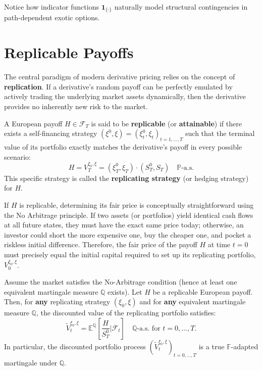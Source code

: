 Notice how indicator functions $\mathbf{1}_{\{\cdot\}}$ naturally model structural contingencies in path-dependent exotic options.

\section{Replicable Payoffs}

The central paradigm of modern derivative pricing relies on the concept of \textbf{replication}. If a derivative's random payoff can be perfectly emulated by actively trading the underlying market assets dynamically, then the derivative provides no inherently new risk to the market.

\begin{definition}
    A European payoff $H \in \mathcal{F}_T$ is said to be \textbf{replicable} (or \textbf{attainable}) if there exists a self-financing strategy $(\xi^0, \xi) = (\xi_t^0, \xi_t)_{t=1, \dots, T}$ such that the terminal value of its portfolio exactly matches the derivative's payoff in every possible scenario:
    $$
        H = V_T^{\xi_0, \xi} = \left(\xi_T^0, \xi_T\right) \cdot \left(S_T^0, S_T\right) \quad \mathbb{P}\text{-a.s.}
    $$
    This specific strategy is called the \textbf{replicating strategy} (or hedging strategy) for $H$.
\end{definition}

If $H$ is replicable, determining its fair price is conceptually straightforward using the No Arbitrage principle. If two assets (or portfolios) yield identical cash flows at all future states, they must have the exact same price today; otherwise, an investor could short the more expensive one, buy the cheaper one, and pocket a riskless initial difference. Therefore, the fair price of the payoff $H$ at time $t=0$ must precisely equal the initial capital required to set up its replicating portfolio, $V_0^{\xi_0, \xi}$.

\begin{proposition} \label{prop:replicable_pricing}
    Assume the market satisfies the No-Arbitrage condition (hence at least one equivalent martingale measure $\mathbb{Q}$ exists). Let $H$ be a replicable European payoff. Then, for \textbf{any} replicating strategy $(\xi_0, \xi)$ and for \textbf{any} equivalent martingale measure $\mathbb{Q}$, the discounted value of the replicating portfolio satisfies:
    \begin{equation}
        \tilde{V}_t^{\xi_0, \xi} = \mathbb{E}^{\mathbb{Q}} \left[ \frac{H}{S_T^0} \mathrel{\Big|} \mathcal{F}_t \right] \quad \mathbb{Q}\text{-a.s. for } t = 0, \dots, T.
    \end{equation}
    In particular, the discounted portfolio process $(\tilde{V}_t^{\xi_0, \xi})_{t=0, \dots, T}$ is a true $\mathbb{F}$-adapted martingale under $\mathbb{Q}$.
\end{proposition}

